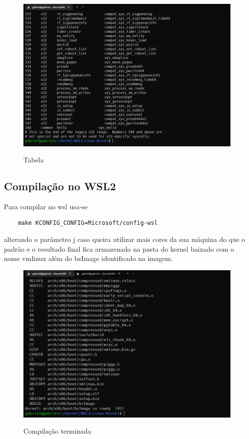 \documentclass[a4paper, 12pt]{article}
\begin{document}
\begin{figure}[!ht]
\centering 
\includegraphics[width=13.5cm]{cat_table.png}
\label{figura:cat_table}
\caption{Tabela}
\end{figure}

\newpage

\subsection{Compilação no WSL2}

Para compilar no wsl usa-se  
\begin{lstlisting} 
    make KCONFIG_CONFIG=Microsoft/config-wsl 
\end{lstlisting} alterando o parâmetro j caso queira utilizar mais cores da sua máquina do que o padrão e o resultado final fica armazenado na pasta do kernel baixado com o nome vmlinux além do bzImage identificado na imagem.

\begin{figure}[!ht]
\centering 
\includegraphics[width=13.5cm]{ready.png}
\label{figura:ready}
\caption{Compilação terminada}
\end{figure}
\end{document}
